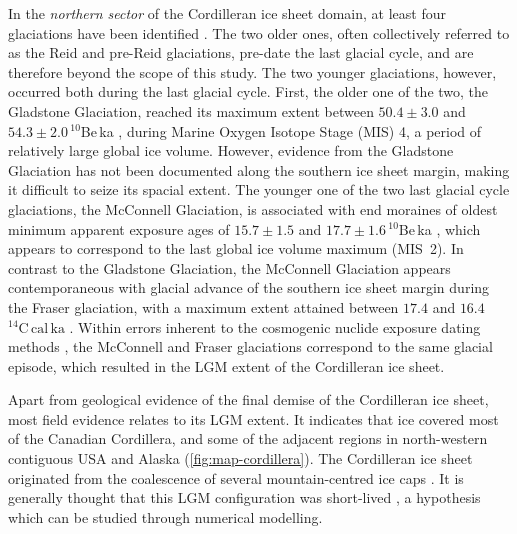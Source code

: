 \documentclass{article}
\newcommand{\unit}[1]{\ensuremath{\mathrm{#1}}}
\begin{document}
In the \emph{northern sector} of the Cordilleran ice sheet domain, at least
four glaciations have been identified
    \citep{Duk-Rodkin.1999, Ward.etal.2007, Ward.etal.2008,
           Briner.Kaufman.2008, Demuro.etal.2012,
           Stroeven.etal.2010, Stroeven.etal.2014}.
The two older ones, often collectively referred to as the Reid and pre-Reid
glaciations, pre-date the last glacial cycle, and are therefore beyond the
scope of this study. The two younger glaciations, however, occurred both during
the last glacial cycle. First, the older one of the two, the Gladstone
Glaciation,
reached its maximum extent between $50.4\pm3.0$ and $54.3\pm2.0\,^{10}$Be\,ka
\citep{Ward.etal.2007}, during Marine Oxygen Isotope Stage (MIS) 4, a period of
relatively large global ice volume. However, evidence from the Gladstone
Glaciation has not been documented along the southern ice sheet margin, making
it difficult to seize its spacial extent. The younger one of the two last
glacial
cycle glaciations, the McConnell Glaciation, is associated with end moraines of
oldest minimum apparent exposure ages of $15.7\pm1.5$ and
$17.7\pm1.6\,^{10}$Be\,ka \citep{Stroeven.etal.2014}, which appears to
correspond to the last global ice volume maximum (MIS~2). In contrast to the
Gladstone Glaciation, the McConnell Glaciation appears contemporaneous with
glacial advance of the southern ice sheet margin during the Fraser glaciation,
with a maximum extent attained between $17.4$ and
$16.4$\,\unit{^{14}C\,cal\,ka} \citep{Porter.Swanson.1998}. Within errors
inherent to the cosmogenic nuclide exposure dating methods
\citep{Heyman.etal.2011}, the McConnell and Fraser glaciations correspond to
the same glacial episode, which resulted in the LGM extent of the Cordilleran
ice sheet.

Apart from geological evidence of the final demise of the Cordilleran ice sheet, most field
evidence relates to its LGM extent. It indicates that ice covered most of the
Canadian Cordillera, and some of the adjacent regions in north-western
contiguous USA and Alaska (\cref{fig:map-cordillera}). The Cordilleran ice
sheet originated from the coalescence of several mountain-centred ice caps
\citep{Davis.Mathews.1944}. It is generally thought that this LGM configuration
was short-lived \citep{Clague.etal.1980, Clague.1985, Cosma.etal.2008}, a
hypothesis which can be studied through numerical modelling.
\end{document}

